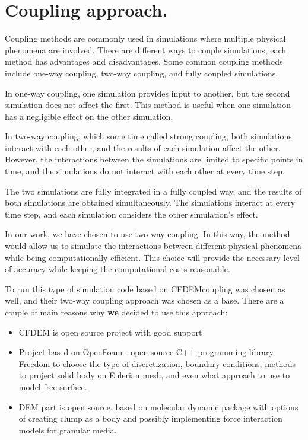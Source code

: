 \section{Coupling approach.}

Coupling methods are commonly used in simulations where multiple physical phenomena are involved. There are different ways to couple simulations; each method has advantages and disadvantages. Some common coupling methods include one-way coupling, two-way coupling, and fully coupled simulations.

In one-way coupling, one simulation provides input to another, but the second simulation does not affect the first. This method is useful when one simulation has a negligible effect on the other simulation.

In two-way coupling, which some time called strong coupling, both simulations interact with each other, and the results of each simulation affect the other. However, the interactions between the simulations are limited to specific points in time, and the simulations do not interact with each other at every time step.

The two simulations are fully integrated in a fully coupled way, and the results of both simulations are obtained simultaneously. The simulations interact at every time step, and each simulation considers the other simulation's effect.

In our work, we have chosen to use two-way coupling. In this way, the method would allow us to simulate the interactions between different physical phenomena while being computationally efficient. This choice will provide the necessary level of accuracy while keeping the computational costs reasonable.

To run this type of simulation code based on CFDEMcoupling \cite{kloss2011liggghts} was chosen as well, and their two-way coupling approach was chosen as a base. There are a couple of main reasons why \textbf{we} decided to use this approach:
\begin{itemize}
    \item CFDEM is open source project with good support
    \item Project based on OpenFoam - open source C++ programming library. Freedom to choose the type of discretization, boundary conditions, methods to project solid body on Eulerian mesh, and even what approach to use to model free surface. 
    \item DEM part is open source, based on molecular dynamic package \cite{LAMMPS} with options of creating clump as a body and possibly implementing force interaction models for granular media.
\end{itemize}

